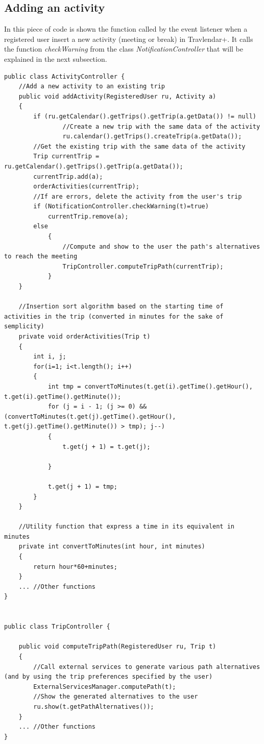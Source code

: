 \documentclass[12pt,titlepage]{article}
\begin{document}
\subsection{Adding an activity}
In this piece of code is shown the function called by the event listener when a registered user insert a new activity (meeting or break) in Travlendar+. It calls the function \textit{checkWarning} from the class \textit{NotificationController} that will be explained in the next subsection.
\begin{lstlisting}
public class ActivityController {
	//Add a new activity to an existing trip
	public void addActivity(RegisteredUser ru, Activity a)
	{
		if (ru.getCalendar().getTrips().getTrip(a.getData()) != null)
				//Create a new trip with the same data of the activity
				ru.calendar().getTrips().createTrip(a.getData()); 
		//Get the existing trip with the same data of the activity
		Trip currentTrip = ru.getCalendar().getTrips().getTrip(a.getData()); 
		currentTrip.add(a);
		orderActivities(currentTrip);
		//If are errors, delete the activity from the user's trip
		if (NotificationController.checkWarning(t)=true) 
			currentTrip.remove(a);
		else 
			{
				//Compute and show to the user the path's alternatives to reach the meeting
				TripController.computeTripPath(currentTrip); 
			}
	}
	
	//Insertion sort algorithm based on the starting time of activities in the trip (converted in minutes for the sake of semplicity)
	private void orderActivities(Trip t) 
	{
		int i, j;
		for(i=1; i<t.length(); i++)
		{
			int tmp = convertToMinutes(t.get(i).getTime().getHour(), t.get(i).getTime().getMinute());
			for (j = i - 1; (j >= 0) && (convertToMinutes(t.get(j).getTime().getHour(), t.get(j).getTime().getMinute()) > tmp); j--) 
			{
	            t.get(j + 1) = t.get(j);
	            
	        }
			
			t.get(j + 1) = tmp;
		}
	}
	
	//Utility function that express a time in its equivalent in minutes 
	private int convertToMinutes(int hour, int minutes)
	{
		return hour*60+minutes;
	}
	... //Other functions
}


public class TripController {

	public void computeTripPath(RegisteredUser ru, Trip t)
	{
		//Call external services to generate various path alternatives (and by using the trip preferences specified by the user)
		ExternalServicesManager.computePath(t);
		//Show the generated alternatives to the user
		ru.show(t.getPathAlternatives()); 
	}
	... //Other functions 
}
\end{lstlisting}
\end{document}
